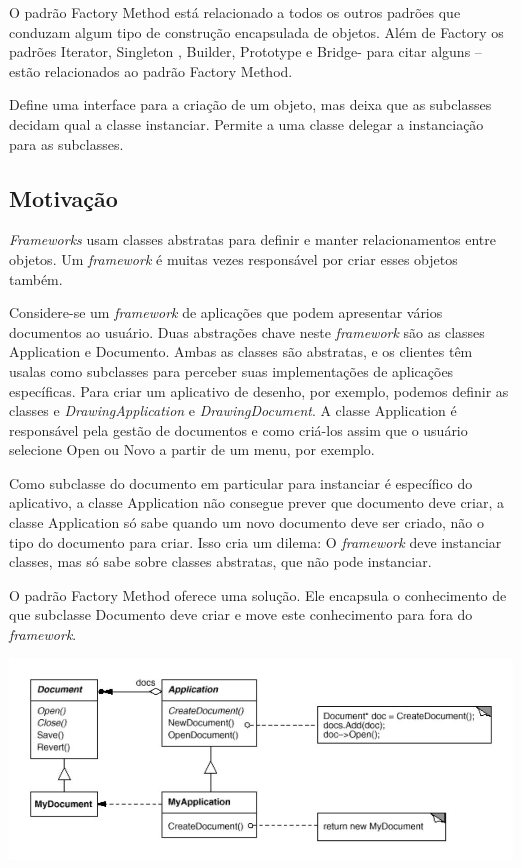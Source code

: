 O padrão Factory Method está relacionado a todos os outros padrões que conduzam
algum tipo de construção encapsulada de objetos. Além de Factory os padrões Iterator,
Singleton , Builder, Prototype e Bridge- para citar alguns – estão relacionados ao padrão
Factory Method.

Define uma interface para a criação de um objeto, mas deixa que as subclasses
decidam qual a classe instanciar. Permite a uma classe delegar a instanciação para as
subclasses.


\subsection{Motivação}
\label{sub:fac_motiv}

\emph{Frameworks} usam classes abstratas para definir e manter relacionamentos entre
objetos. Um \emph{framework} é muitas vezes responsável por criar esses objetos também.

Considere-se um \emph{framework} de aplicações que podem apresentar vários documentos ao
usuário. Duas abstrações chave neste \emph{framework} são as classes Application e
Documento. Ambas as classes são abstratas, e os clientes têm usalas como subclasses para perceber
suas implementações de aplicações específicas. Para criar um aplicativo de desenho, por
exemplo, podemos definir as classes e \emph{DrawingApplication} e \emph{DrawingDocument}. A
classe Application é responsável pela gestão de documentos e como criá-los assim que o usuário selecione Open ou Novo a partir de um menu, por exemplo.

Como subclasse do documento em particular para instanciar é específico do aplicativo,
a classe Application não consegue prever que documento deve criar, a classe Application só sabe quando um novo documento deve ser criado, não o tipo do documento para criar. Isso cria um dilema: O \emph{framework} deve instanciar classes, mas só sabe sobre classes abstratas, que não pode instanciar.

O padrão Factory Method oferece uma solução. Ele encapsula o conhecimento de
que subclasse Documento deve criar e move este conhecimento para fora do \emph{framework}.

\begin{center}
	\includegraphics[scale=0.50]{Figuras/image1.jpg}
	\label{fig:diagrama1}
\end{center}

